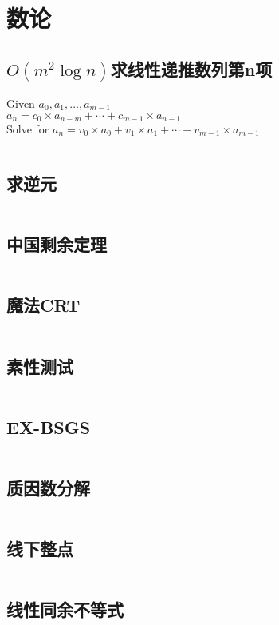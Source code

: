 \chapter{数论}
\section{$O(m^2\log n)$求线性递推数列第n项}
Given $a_0, a_1, \ldots, a_{m - 1}$\\
	$a_n = c_0 \times a_{n - m} + \cdots + c_{m - 1} \times a_{n - 1}$\\
	Solve for $a_n = v_0 \times a_0 + v_1 \times a_1 + \cdots + v_{m - 1} \times a_{m - 1}$\\
\inputminted{cpp}{\source/number-theory/linear-recurrence.cpp}
\section{求逆元}
\inputminted{cpp}{\source/number-theory/get-inversion.cpp}
\section{中国剩余定理}
\inputminted{cpp}{\source/number-theory/chinese-remainder-theorem.cpp}
\section{魔法CRT}
\inputminted{cpp}{\source/number-theory/magic-crt.cpp}
\section{素性测试}
\inputminted{cpp}{\source/number-theory/primality-test.cpp}
\section{EX-BSGS}
\inputminted{cpp}{\source/number-theory/ex_bsgs.cpp}
\section{质因数分解}
\inputminted{cpp}{\source/number-theory/pollards-rho-algorithm.cpp}
\section{线下整点}
\inputminted{cpp}{\source/number-theory/integer-lattice-under-segment.cpp}
\section{线性同余不等式}
\inputminted{cpp}{\source/number-theory/线性同余不等式.cpp}
